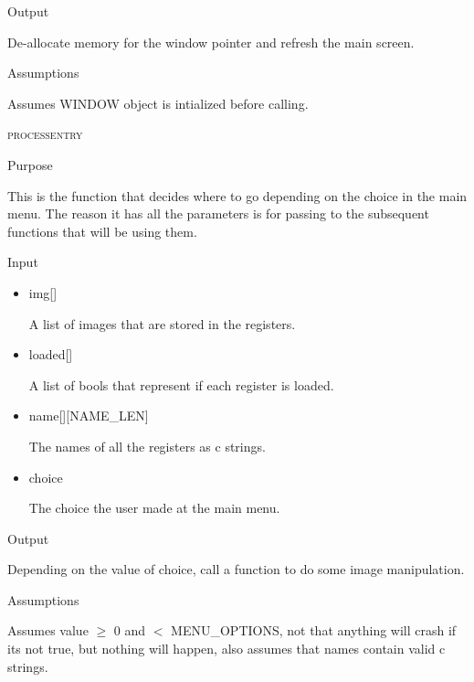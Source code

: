 \documentclass[pdftex, 11pt]{article}
\begin{document}
\begin{description}
\begin{description}
\begin{itemize}
				\end{itemize}

			\item{Output}

				De-allocate memory for the window pointer and refresh the
				main screen.

			\item{Assumptions}

				Assumes WINDOW object is intialized before calling.


		\end{description}


	\item{\textsc{processentry}}
		\begin{description}
			\item{Purpose}

				This is the function that decides where to go depending on the choice in the
				main menu.  The reason it has all the parameters is for passing to the
				subsequent functions that will be using them.

			\item{Input}

				\begin{itemize}

					\item{img[]}

						A list of images that are stored in the registers.

					\item{loaded[]}

						A list of bools that represent if each register is loaded.

					\item{name[][NAME\_LEN]}

						The names of all the registers as c strings.

					\item{choice}
				
						The choice the user made at the main menu.

				\end{itemize}

			\item{Output}

				Depending on the value of choice, call a function to do some image
				manipulation.

			\item{Assumptions}

				Assumes value $\geq$ 0 and $<$ MENU\_OPTIONS, not that anything
				will crash if its not true, but nothing will happen, also
				assumes that names contain valid c strings.


\end{description}
\end{description}
\end{document}
